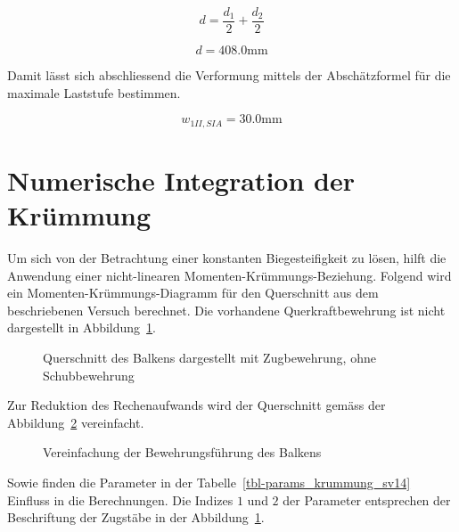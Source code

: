\documentclass[
  12pt,
  letterpaper,
  egregdoesnotlikesansseriftitles]{scrreprt}
\begin{document}
\begin{equation}d = \frac{d_{1}}{2} + \frac{d_{2}}{2}\end{equation}

\begin{equation}d = 408.0 \text{mm}\end{equation}

Damit lässt sich abschliessend die Verformung mittels der Abschätzformel
für die maximale Laststufe bestimmen.

\begin{equation}w_{1 II,SIA} = 30.0 \text{mm}\end{equation}

\section{Numerische Integration der
Krümmung}\label{numerische-integration-der-kruxfcmmung-1}

Um sich von der Betrachtung einer konstanten Biegesteifigkeit zu lösen,
hilft die Anwendung einer nicht-linearen Momenten-Krümmungs-Beziehung.
Folgend wird ein Momenten-Krümmungs-Diagramm für den Querschnitt aus dem
beschriebenen Versuch berechnet. Die vorhandene Querkraftbewehrung ist
nicht dargestellt in Abbildung~\ref{fig-qs_sv14}.

\begin{figure}[H]


\caption{\label{fig-qs_sv14}Querschnitt des Balkens dargestellt mit
Zugbewehrung, ohne Schubbewehrung}

\end{figure}%

Zur Reduktion des Rechenaufwands wird der Querschnitt gemäss der
Abbildung~\ref{fig-qs_sv14_vereinfachung} vereinfacht.

\begin{figure}[H]


\caption{\label{fig-qs_sv14_vereinfachung}Vereinfachung der
Bewehrungsführung des Balkens}

\end{figure}%

Sowie finden die Parameter in der Tabelle~\ref{tbl-params_krummung_sv14}
Einfluss in die Berechnungen. Die Indizes \(1\) und \(2\) der Parameter
entsprechen der Beschriftung der Zugstäbe in der
Abbildung~\ref{fig-qs_sv14}.
\end{document}
